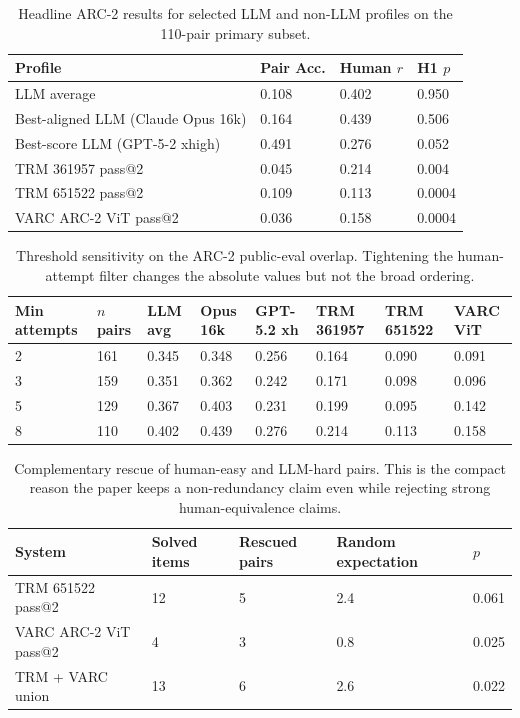 \documentclass[11pt,letterpaper]{article}
\begin{document}
\begin{table}[H]
\centering
\small
\caption{Headline ARC-2 results for selected LLM and non-LLM profiles on the 110-pair primary subset.}
\begin{tabular}{p{2.45in}p{0.8in}p{0.9in}p{0.8in}}
\toprule
\textbf{Profile} & \textbf{Pair Acc.} & \textbf{Human $r$} & \textbf{H1 $p$} \\
\midrule
LLM average & 0.108 & 0.402 & 0.950 \\
Best-aligned LLM (Claude Opus 16k) & 0.164 & 0.439 & 0.506 \\
Best-score LLM (GPT-5-2 xhigh) & 0.491 & 0.276 & 0.052 \\
TRM 361957 pass@2 & 0.045 & 0.214 & 0.004 \\
TRM 651522 pass@2 & 0.109 & 0.113 & 0.0004 \\
VARC ARC-2 ViT pass@2 & 0.036 & 0.158 & 0.0004 \\
\bottomrule
\end{tabular}
\end{table}

\begin{table}[H]
\centering
\scriptsize
\caption{Threshold sensitivity on the ARC-2 public-eval overlap. Tightening the human-attempt filter changes the absolute values but not the broad ordering.}
\begin{tabular}{p{0.55in}p{0.55in}p{0.62in}p{0.62in}p{0.62in}p{0.62in}p{0.62in}p{0.62in}}
\toprule
\textbf{Min attempts} & \textbf{$n$ pairs} & \textbf{LLM avg} & \textbf{Opus 16k} & \textbf{GPT-5.2 xh} & \textbf{TRM 361957} & \textbf{TRM 651522} & \textbf{VARC ViT} \\
\midrule
2 & 161 & 0.345 & 0.348 & 0.256 & 0.164 & 0.090 & 0.091 \\
3 & 159 & 0.351 & 0.362 & 0.242 & 0.171 & 0.098 & 0.096 \\
5 & 129 & 0.367 & 0.403 & 0.231 & 0.199 & 0.095 & 0.142 \\
8 & 110 & 0.402 & 0.439 & 0.276 & 0.214 & 0.113 & 0.158 \\
\bottomrule
\end{tabular}
\end{table}

\begin{table}[H]
\centering
\small
\caption{Complementary rescue of human-easy and LLM-hard pairs. This is the compact reason the paper keeps a non-redundancy claim even while rejecting strong human-equivalence claims.}
\begin{tabular}{p{2.2in}p{0.8in}p{0.8in}p{0.9in}p{0.8in}}
\toprule
\textbf{System} & \textbf{Solved items} & \textbf{Rescued pairs} & \textbf{Random expectation} & \textbf{$p$} \\
\midrule
TRM 651522 pass@2 & 12 & 5 & 2.4 & 0.061 \\
VARC ARC-2 ViT pass@2 & 4 & 3 & 0.8 & 0.025 \\
TRM + VARC union & 13 & 6 & 2.6 & 0.022 \\
\bottomrule
\end{tabular}
\end{table}
\end{document}
